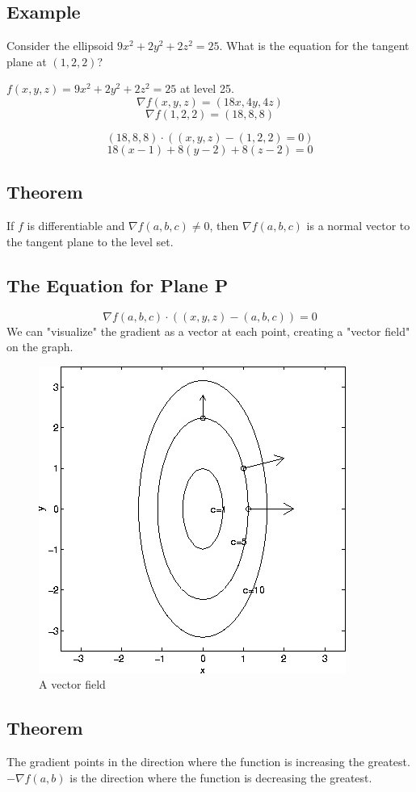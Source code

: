 \documentclass{article}
\begin{document}
\subsection*{Example}
Consider the ellipsoid $9x^2+2y^2+2z^2=25$.
What is the equation for the tangent plane at $(1,2,2)$?

$f(x,y,z) = 9x^2+2y^2+2z^2=25$ at level 25.
\[\nabla f(x,y,z)=(18x,4y,4z)\]
\[\nabla f(1,2,2)=(18,8,8)\]

\[(18,8,8)\cdot ((x,y,z)-(1,2,2)=0)\]
\[18(x-1)+8(y-2)+8(z-2)=0\]

\subsection*{Theorem}
If $f$ is differentiable and $\nabla f(a,b,c) \neq 0$, then $\nabla f(a,b,c)$ is a normal vector to the tangent plane to the level set.

\subsection*{The Equation for Plane P}

\[\nabla f(a,b,c)\cdot ((x,y,z)-(a,b,c))=0\]
We can "visualize" the gradient as a vector at each point, creating a "vector field" on the graph.

\begin{figure}[h!]
    \centering
    \includegraphics[scale = 1]{vectorField.jpg}
    \caption{A vector field}
    \label{}
\end{figure}
\subsection*{Theorem}
The gradient points in the direction where the function is increasing the greatest.\\
$-\nabla f(a,b) $ is the direction where the function is decreasing the greatest.
\end{document}
